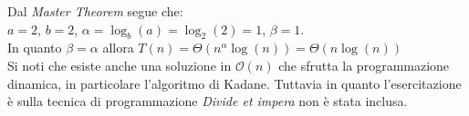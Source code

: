 \documentclass[../cheatSheetAlgoritmi.tex]{subfiles}
\begin{document}
Dal \textit{Master Theorem} segue che: \\
$a = 2$, $b = 2$, $\alpha = \log_b(a) = \log_2(2) = 1$, $\beta = 1$. \\ 
In quanto $\beta = \alpha$ allora $T(n) = \Theta(n^{\alpha}\log(n)) = \Theta(n\log(n))$ \\
Si noti che esiste anche una soluzione in $\mathcal{O}(n)$ che sfrutta la programmazione dinamica, in particolare l'algoritmo di Kadane. Tuttavia in quanto l'esercitazione è sulla tecnica di programmazione \textit{Divide et impera} non è stata inclusa.
\end{document}

